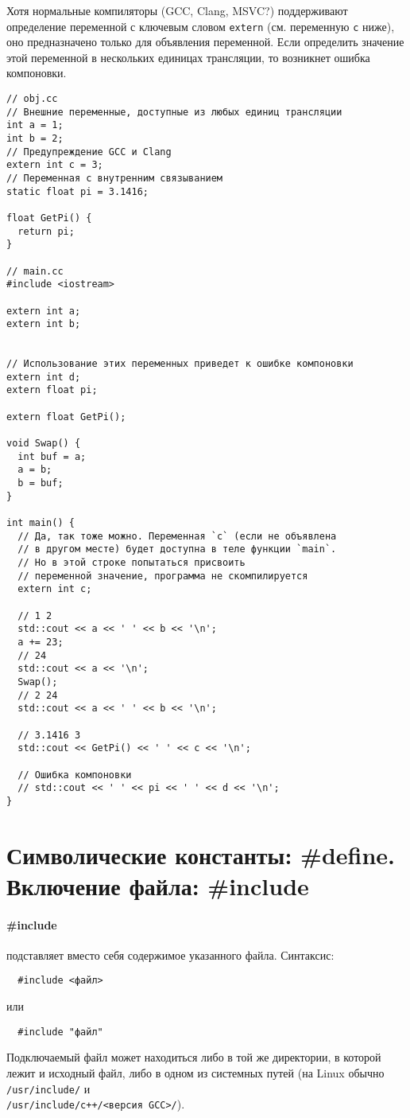 Хотя нормальные компиляторы (GCC, Clang, MSVC?) поддерживают определение переменной с ключевым словом
\verb|extern| (см. переменную \verb|c| ниже), оно предназначено только для объявления переменной. Если определить
значение этой переменной в нескольких единицах трансляции, то возникнет ошибка компоновки.
\begin{verbatim}
// obj.cc
// Внешние переменные, доступные из любых единиц трансляции
int a = 1;
int b = 2;
// Предупреждение GCC и Clang
extern int c = 3;
// Переменная с внутренним связыванием
static float pi = 3.1416;

float GetPi() {
  return pi;
}

// main.cc
#include <iostream>

extern int a;
extern int b;


// Использование этих переменных приведет к ошибке компоновки
extern int d;
extern float pi;

extern float GetPi();

void Swap() {
  int buf = a;
  a = b;
  b = buf;
}

int main() {
  // Да, так тоже можно. Переменная `c` (если не объявлена
  // в другом месте) будет доступна в теле функции `main`.
  // Но в этой строке попытаться присвоить
  // переменной значение, программа не скомпилируется
  extern int c;
  
  // 1 2
  std::cout << a << ' ' << b << '\n';
  a += 23;
  // 24
  std::cout << a << '\n';
  Swap();
  // 2 24
  std::cout << a << ' ' << b << '\n';

  // 3.1416 3
  std::cout << GetPi() << ' ' << c << '\n';

  // Ошибка компоновки
  // std::cout << ' ' << pi << ' ' << d << '\n';
}
\end{verbatim}


\section{Символические константы: \#define. Включение файла: \#include}
\paragraph{\#include} подставляет вместо себя содержимое указанного файла. Синтаксис:
\begin{verbatim}
  #include <файл>
\end{verbatim}
или
\begin{verbatim}
  #include "файл"
\end{verbatim}
Подключаемый файл может находиться либо в той же директории, в которой лежит и исходный файл,
либо в одном из системных путей (на Linux обычно \verb|/usr/include/| и \\ \verb|/usr/include/c++/<версия GCC>/|).


